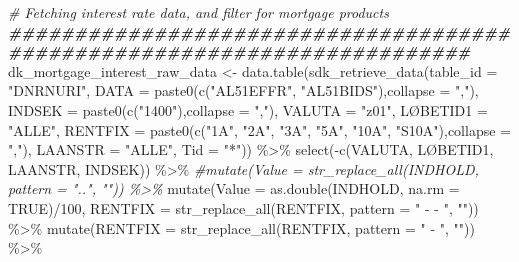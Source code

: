 \documentclass[
]{book}
\newenvironment{Shaded}{\begin{snugshade}}{\end{snugshade}}
\newcommand{\AttributeTok}[1]{\textcolor[rgb]{0.77,0.63,0.00}{#1}}
\newcommand{\CommentTok}[1]{\textcolor[rgb]{0.56,0.35,0.01}{\textit{#1}}}
\newcommand{\ConstantTok}[1]{\textcolor[rgb]{0.00,0.00,0.00}{#1}}
\newcommand{\DecValTok}[1]{\textcolor[rgb]{0.00,0.00,0.81}{#1}}
\newcommand{\DocumentationTok}[1]{\textcolor[rgb]{0.56,0.35,0.01}{\textbf{\textit{#1}}}}
\newcommand{\FunctionTok}[1]{\textcolor[rgb]{0.00,0.00,0.00}{#1}}
\newcommand{\NormalTok}[1]{#1}
\newcommand{\OtherTok}[1]{\textcolor[rgb]{0.56,0.35,0.01}{#1}}
\newcommand{\SpecialCharTok}[1]{\textcolor[rgb]{0.00,0.00,0.00}{#1}}
\newcommand{\StringTok}[1]{\textcolor[rgb]{0.31,0.60,0.02}{#1}}
\begin{document}
\begin{Shaded}
\begin{Highlighting}[]
\CommentTok{\# Fetching interest rate data, and filter for mortgage products}
\DocumentationTok{\#\#\#\#\#\#\#\#\#\#\#\#\#\#\#\#\#\#\#\#\#\#\#\#\#\#\#\#\#\#\#\#\#\#\#\#\#\#\#\#\#\#\#\#\#\#\#\#\#\#\#\#\#\#\#\#\#\#\#\#\#\#\#\#\#\#\#\#\#\#\#\#\#}
\NormalTok{dk\_mortgage\_interest\_raw\_data }\OtherTok{\textless{}{-}} \FunctionTok{data.table}\NormalTok{(}\FunctionTok{sdk\_retrieve\_data}\NormalTok{(}\AttributeTok{table\_id =} \StringTok{"DNRNURI"}\NormalTok{, }
                                                              \AttributeTok{DATA =} \FunctionTok{paste0}\NormalTok{(}\FunctionTok{c}\NormalTok{(}\StringTok{"AL51EFFR"}\NormalTok{, }\StringTok{"AL51BIDS"}\NormalTok{),}\AttributeTok{collapse =} \StringTok{","}\NormalTok{),}
                                                              \AttributeTok{INDSEK =} \FunctionTok{paste0}\NormalTok{(}\FunctionTok{c}\NormalTok{(}\StringTok{"1400"}\NormalTok{),}\AttributeTok{collapse =} \StringTok{","}\NormalTok{),}
                                                              \AttributeTok{VALUTA =} \StringTok{"z01"}\NormalTok{, }
\NormalTok{                                                              LØBETID1 }\OtherTok{=} \StringTok{"ALLE"}\NormalTok{,}
                                                              \AttributeTok{RENTFIX =} \FunctionTok{paste0}\NormalTok{(}\FunctionTok{c}\NormalTok{(}\StringTok{"1A"}\NormalTok{, }\StringTok{"2A"}\NormalTok{, }\StringTok{"3A"}\NormalTok{, }\StringTok{"5A"}\NormalTok{, }\StringTok{"10A"}\NormalTok{, }\StringTok{"S10A"}\NormalTok{),}\AttributeTok{collapse =} \StringTok{","}\NormalTok{),}
                                                              \AttributeTok{LAANSTR =} \StringTok{"ALLE"}\NormalTok{,}
                                                              \AttributeTok{Tid =} \StringTok{"*"}\NormalTok{)) }\SpecialCharTok{\%\textgreater{}\%}
    \FunctionTok{select}\NormalTok{(}\SpecialCharTok{{-}}\FunctionTok{c}\NormalTok{(VALUTA, LØBETID1, LAANSTR, INDSEK)) }\SpecialCharTok{\%\textgreater{}\%}
    \CommentTok{\#mutate(Value = str\_replace\_all(INDHOLD, pattern = "..", "")) \%\textgreater{}\%}
    \FunctionTok{mutate}\NormalTok{(}\AttributeTok{Value =} \FunctionTok{as.double}\NormalTok{(INDHOLD, }\AttributeTok{na.rm =} \ConstantTok{TRUE}\NormalTok{)}\SpecialCharTok{/}\DecValTok{100}\NormalTok{,}
           \AttributeTok{RENTFIX =} \FunctionTok{str\_replace\_all}\NormalTok{(RENTFIX, }\AttributeTok{pattern =} \StringTok{" {-} {-} "}\NormalTok{, }\StringTok{""}\NormalTok{)) }\SpecialCharTok{\%\textgreater{}\%}
    \FunctionTok{mutate}\NormalTok{(}\AttributeTok{RENTFIX =} \FunctionTok{str\_replace\_all}\NormalTok{(RENTFIX, }\AttributeTok{pattern =} \StringTok{" {-} "}\NormalTok{, }\StringTok{""}\NormalTok{)) }\SpecialCharTok{\%\textgreater{}\%}

\end{Highlighting}
\end{Shaded}
\end{document}
